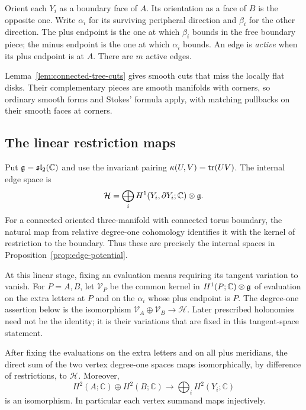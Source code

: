 Orient each $Y_i$ as a boundary face of $A$.  Its orientation as a face
of $B$ is the opposite one.  Write
$\alpha_i$ for its surviving peripheral direction and $\beta_i$ for the
other direction.  The plus endpoint is the one at which $\beta_i$ bounds
in the free boundary piece; the minus endpoint is the one at which
$\alpha_i$ bounds.  An edge is \emph{active} when its plus endpoint is at
$A$.  There are $m$ active edges.

Lemma~\ref{lem:connected-tree-cuts} gives smooth cuts that miss the locally
flat disks.  Their complementary pieces are smooth manifolds with corners,
so ordinary smooth forms and Stokes' formula apply, with matching
pullbacks on their smooth faces at corners.

\subsection{The linear restriction maps}

Put $\mathfrak{g}=\mathfrak{sl}_2(\mathbb C)$ and use the invariant pairing
$\kappa(U,V)=\operatorname{tr}(UV)$.  The internal edge space is
\[
 \mathcal H=\bigoplus_i
 H^1(Y_i,\partial Y_i;\mathbb C)\otimes\mathfrak{g}.
\]
For a connected oriented three-manifold with connected torus boundary,
the natural map from relative degree-one cohomology identifies it with
the kernel of restriction to the boundary.  Thus these are precisely the
internal spaces in Proposition~\ref{prop:edge-potential}.

At this linear stage, fixing an evaluation means requiring its tangent
variation to vanish.  For \(P=A,B\), let \(\mathcal V_P\) be the common
kernel in \(H^1(P;\mathbb C)\otimes\mathfrak{g}\) of evaluation on the extra
letters at \(P\) and on the \(\alpha_i\) whose plus endpoint is \(P\).
The degree-one assertion below is the isomorphism
\(\mathcal V_A\oplus\mathcal V_B\to\mathcal H\).  Later prescribed
holonomies need not be the identity; it is their variations that are
fixed in this tangent-space statement.

\begin{lemma}
\label{lem:vertex-linear}
After fixing the evaluations on the extra letters and on all plus
meridians, the direct sum of the two vertex degree-one spaces maps
isomorphically, by difference of restrictions, to $\mathcal H$.
Moreover,
\begin{equation}
\label{eq:vertex-h2-isomorphism}
 H^2(A;\mathbb C)\oplus H^2(B;\mathbb C)
       \longrightarrow\bigoplus_i H^2(Y_i;\mathbb C)
\end{equation}
is an isomorphism.  In particular each vertex summand maps injectively.
\end{lemma}

